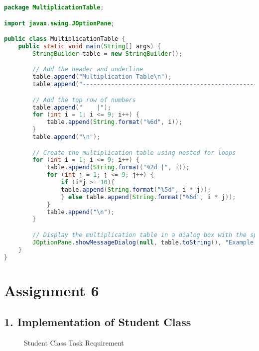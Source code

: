 \documentclass{article}
\begin{document}
\begin{lstlisting}[language=Java, caption=MultiplicationTable.java]
package MultiplicationTable;

import javax.swing.JOptionPane;

public class MultiplicationTable {
    public static void main(String[] args) {
        StringBuilder table = new StringBuilder();

        // Add the header and underline
        table.append("Multiplication Table\n");
        table.append("-------------------------------------------------------\n");

        // Add the top row of numbers
        table.append("    |");
        for (int i = 1; i <= 9; i++) {
            table.append(String.format("%6d", i));
        }
        table.append("\n");

        // Create the multiplication table using nested for loops
        for (int i = 1; i <= 9; i++) {
            table.append(String.format("%2d |", i));
            for (int j = 1; j <= 9; j++) {
                if (i*j >= 10){
                table.append(String.format("%5d", i * j));
                } else table.append(String.format("%6d", i * j));
            }
            table.append("\n");
        }

        // Display the multiplication table in a dialog box with the specified header
        JOptionPane.showMessageDialog(null, table.toString(), "Example 3.4 Output", JOptionPane.INFORMATION_MESSAGE);
    }
}
\end{lstlisting}

\section*{Assignment 6}

\subsection*{1. Implementation of Student Class}

\begin{figure}[h]
    \centering
    \caption{Student Class Task Requirement}
\end{figure}
\end{document}
